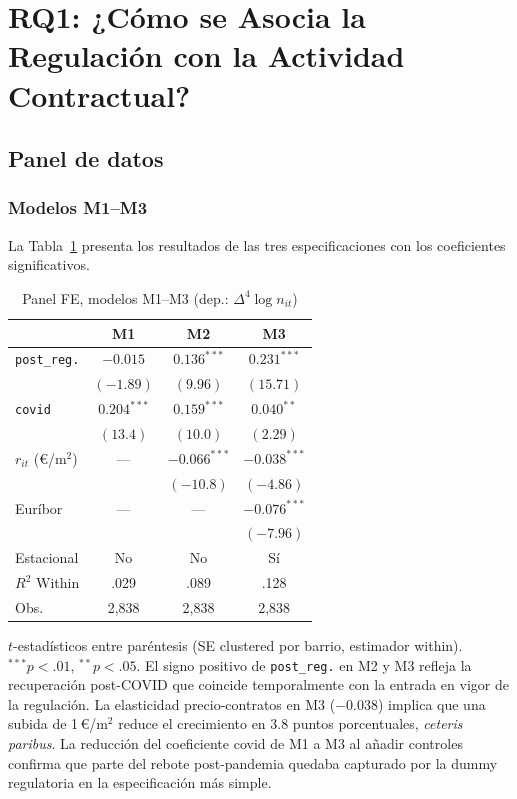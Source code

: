 \documentclass[10pt,a4paper,twocolumn]{article}
\begin{document}
\section{RQ1: ¿Cómo se Asocia la Regulación con la Actividad Contractual?}
\label{sec:rq1}

\subsection{Panel de datos}

\subsubsection{Modelos M1--M3}

La Tabla~\ref{tab:panel} presenta los resultados de las tres especificaciones con los coeficientes significativos.

\begin{table}[!t]
\caption{Panel FE, modelos M1--M3 (dep.: $\Delta^4\log n_{it}$)}
\label{tab:panel}
\centering\small
\begin{threeparttable}
\begin{tabular}{lccc}
\toprule
 & M1 & M2 & M3 \\
\midrule
\texttt{post\_reg.}
  & $-0.015$ & $0.136^{***}$ & $0.231^{***}$ \\
  & $(-1.89)$ & $(9.96)$ & $(15.71)$ \\
\texttt{covid}
  & $0.204^{***}$ & $0.159^{***}$ & $0.040^{**}$ \\
  & $(13.4)$ & $(10.0)$ & $(2.29)$ \\
$r_{it}$ (\euro/m$^2$)
  & --- & $-0.066^{***}$ & $-0.038^{***}$ \\
  & & $(-10.8)$ & $(-4.86)$ \\
Euríbor
  & --- & --- & $-0.076^{***}$ \\
  & & & $(-7.96)$ \\
Estacional & No & No & Sí \\
\midrule
$R^2$ Within & .029 & .089 & .128 \\
Obs. & 2{,}838 & 2{,}838 & 2{,}838 \\
\bottomrule
\end{tabular}
\begin{tablenotes}\small
\item $t$-estadísticos entre paréntesis (SE clustered por barrio, estimador within).
$^{***}p{<}.01$, $^{**}p{<}.05$.
El signo positivo de \texttt{post\_reg.} en M2 y M3 refleja la recuperación
post-COVID que coincide temporalmente con la entrada en vigor de la regulación.
La elasticidad precio-contratos en M3 ($-0.038$) implica que una subida de
1\,\euro/m$^2$ reduce el crecimiento en 3.8 puntos porcentuales, \textit{ceteris paribus}.
La reducción del coeficiente covid de M1 a M3 al añadir controles confirma que
parte del rebote post-pandemia quedaba capturado por la dummy regulatoria en
la especificación más simple.
\end{tablenotes}
\end{threeparttable}
\end{table}
\end{document}
